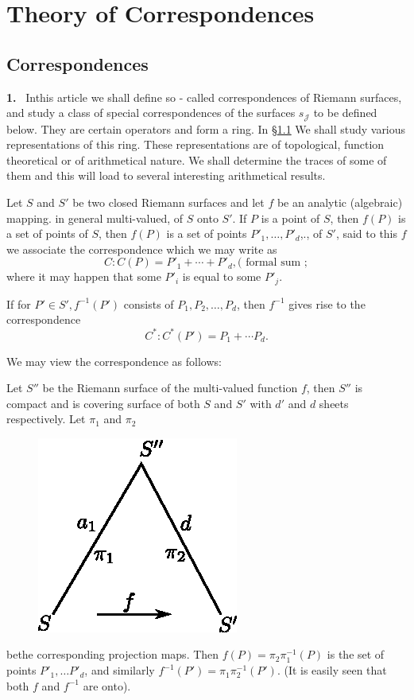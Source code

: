
\chapter{Theory of Correspondences}\label{chap3}

\setcounter{section}{6}
\section{Correspondences}\label{chap3:sec7}

\textbf{1.}~ In\pageoriginale this article we shall define so - called
correspondences of 
  Riemann surfaces, and study a class of special correspondences of
  the surfaces $s_{\mathcal{J}}$ to be defined below. They are certain
  operators and form a ring. In \S \ref{chap3:sec7} We shall study various
  representations of this ring. These representations are of
  topological, function theoretical or of arithmetical nature. We
  shall determine the traces of some of them  and this will load to
  several interesting arithmetical results.  

  Let $S$ and $S'$ be two closed Riemann surfaces and let $f$ be an
  analytic (algebraic) mapping.  in general multi-valued, of $S$ onto
  $S'$. If $P$ is a point of $S$, then $f(P)$ is a set of points of
  $S$, then $f(P)$ is a set of points $P'_1,  \ldots,  P'_d$,., of
  $S'$, said to this $f$ we associate the correspondence which we may
  write as  
  $$
  C : C(P) = P' _1 + \cdots + P'_d, ( \text{ formal sum }; 
  $$
  where it may happen that some $P' _i$ is equal to some $P' _j$. 
  
  If for $P' \in S' ,  f^{-1} (P')$ consists of $P_1,  P_2, \ldots,
  P_d$, then $f^{-1}$ gives rise to the correspondence  
  $$
  C^* : C^*(P') = P_1 + \cdots P_d. 
  $$
  

  We may view the correspondence as follows:

  Let $S''$ be the Riemann surface of the multi-valued function $f$,
  then $S''$ is compact and is covering surface of both $S$ and $S'$
  with $d'$ and $d$ sheets respectively. Let $\pi_1$ and $\pi_2$ 
 \begin{figure}[H]
    \centerline{\includegraphics{vol9-figures/fig9-9.eps}}
  \end{figure}  
\noindent 
 be\pageoriginale  the corresponding projection maps. Then $f(P) =
  \pi _2 \pi^{-1}_1 
  (P)$ is the set of points $P'_1,  \ldots P'_d$, and similarly
  $f^{-1}(P') = \pi_1\pi^{-1}_2 (P')$. (It is easily seen that both
  $f$ and $f^{-1}$ are onto).  
 

